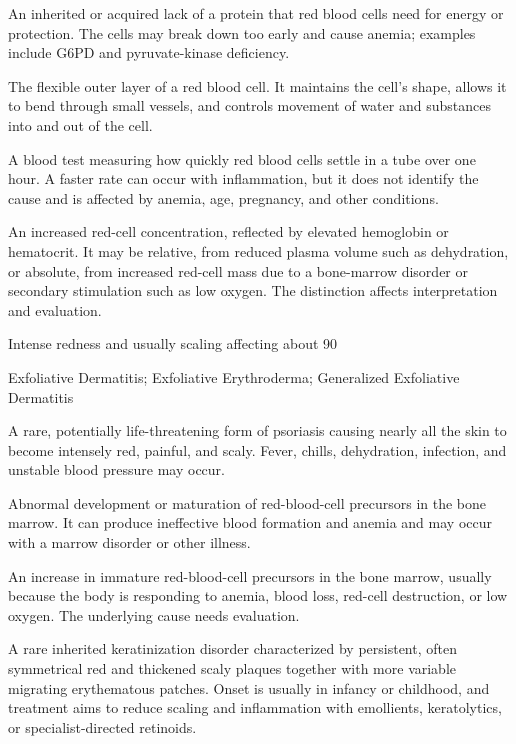  An inherited or acquired lack of a protein that red blood cells need for energy or protection. The cells may break down too early and cause anemia; examples include G6PD and pyruvate-kinase deficiency.

 The flexible outer layer of a red blood cell. It maintains the cell’s shape, allows it to bend through small vessels, and controls movement of water and substances into and out of the cell.

 A blood test measuring how quickly red blood cells settle in a tube over one hour. A faster rate can occur with inflammation, but it does not identify the cause and is affected by anemia, age, pregnancy, and other conditions.

 An increased red-cell concentration, reflected by elevated hemoglobin or hematocrit. It may be relative, from reduced plasma volume such as dehydration, or absolute, from increased red-cell mass due to a bone-marrow disorder or secondary stimulation such as low oxygen. The distinction affects interpretation and evaluation.

 Intense redness and usually scaling affecting about 90%

\synonyms
Exfoliative Dermatitis; Exfoliative Erythroderma; Generalized Exfoliative Dermatitis

 A rare, potentially life-threatening form of psoriasis causing nearly all the skin to become intensely red, painful, and scaly. Fever, chills, dehydration, infection, and unstable blood pressure may occur.

 Abnormal development or maturation of red-blood-cell precursors in the bone marrow. It can produce ineffective blood formation and anemia and may occur with a marrow disorder or other illness.

 An increase in immature red-blood-cell precursors in the bone marrow, usually because the body is responding to anemia, blood loss, red-cell destruction, or low oxygen. The underlying cause needs evaluation.

 A rare inherited keratinization disorder characterized by persistent, often symmetrical red and thickened scaly plaques together with more variable migrating erythematous patches. Onset is usually in infancy or childhood, and treatment aims to reduce scaling and inflammation with emollients, keratolytics, or specialist-directed retinoids.

